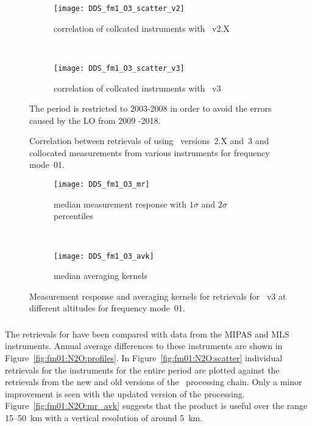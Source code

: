 \begin{figure}[tbhp]
    \centering
    \begin{subfigure}[b]{0.49\textwidth}
        \texttt{[image: DDS\_fm1\_O3\_scatter\_v2]}
        \caption{correlation of collcated instruments with \smr~v2.X}
        \label{fig:fm01:O3:scatter:v2}
    \end{subfigure}
    \,
    \begin{subfigure}[b]{0.49\textwidth}
        \texttt{[image: DDS\_fm1\_O3\_scatter\_v3]}
        \caption{correlation of collcated instruments with \smr~v3}
        \label{fig:fm01:O3:scatter:v3}
    \end{subfigure}
    \caption{Correlation between retrievals of  using \smr\
    versions~2.X and~3 and collocated measurements from various instruments
    for frequency mode~01.} The period is restricted to 2003-2008 in order to avoid the errors caused by the LO from 2009 -2018. 
    \label{fig:fm01:O3:scatter}
\end{figure}

\begin{figure}[tbhp]
    \centering
    \begin{subfigure}[b]{0.49\textwidth}
        \texttt{[image: DDS\_fm1\_O3\_mr]}
        \caption{median measurement response with $1\sigma$ and $2\sigma$
        percentiles}
        \label{fig:fm01:O3:mr}
    \end{subfigure}
    \,
    \begin{subfigure}[b]{0.49\textwidth}
        \texttt{[image: DDS\_fm1\_O3\_avk]}
        \caption{median averaging kernels\newline~}
        \label{fig:fm01:O3:avk}
    \end{subfigure}
    \caption{Measurement response and averaging kernels for 
    retrievals for \smr~v3 at different altitudes for frequency mode~01.}
    \label{fig:fm01:O3:mr_avk}
\end{figure}



\subsubsection{}
\label{sec:fm01:comparison:N2O}
The retrievals for \chem{N_2O} have been compared with data from the MIPAS and
MLS instruments. Annual average differences to these instruments are shown in
Figure~\ref{fig:fm01:N2O:profiles}. In Figure~\ref{fig:fm01:N2O:scatter}
individual retrievals for the instruments for the entire period are plotted
against the retrievals from the new and old versions of the \smr\ processing
chain. Only a minor improvement is seen with the updated version of the
processing. Figure~\ref{fig:fm01:N2O:mr_avk} suggests that the product is
useful over the range 15--50~km with a vertical resolution of around 5~km.


